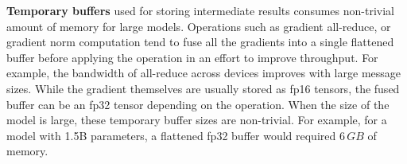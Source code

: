 \documentclass{article}
\begin{document}

\textbf{Temporary buffers} used for storing intermediate results consumes non-trivial amount of memory for large models.   Operations such as gradient all-reduce, or gradient norm computation tend to fuse all the gradients into a single flattened buffer before applying the operation in an effort to improve throughput. For example, the bandwidth of all-reduce across devices improves with large message sizes. While the gradient themselves are usually stored as fp16 tensors, the fused buffer can be an fp32 tensor depending on the operation. When the size of the model is large, these temporary buffer sizes are non-trivial. For example, for a model with 1.5B parameters, a flattened fp32 buffer would required $6\,GB$ of memory. 
\end{document}
